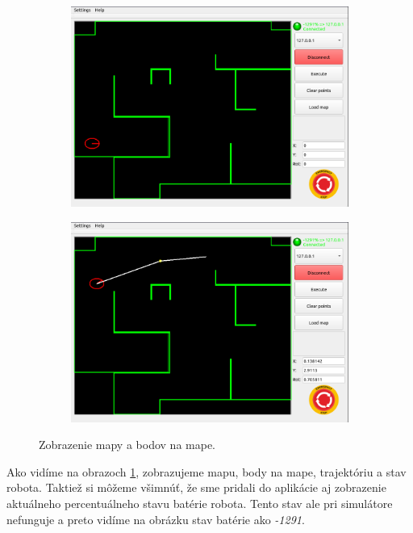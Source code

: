 \begin{figure}[!htbp]
	\vspace{1cm}
	\begin{subfigure}{0.49\textwidth}
		\includegraphics[width=\textwidth]{img/supervisor_loaded_map_start.png}
	\end{subfigure}
	\hfill
	\begin{subfigure}{0.49\textwidth}
		\includegraphics[width=\textwidth]{img/supervisor_motion.png}
	\end{subfigure}

	\caption{ Zobrazenie mapy a bodov na mape. }
	\label{fig:map}
\end{figure}

Ako vidíme na obrazoch \ref{fig:map}, zobrazujeme mapu, body na mape, trajektóriu a stav robota.
Taktiež si môžeme všimnúť, že sme pridali do aplikácie aj zobrazenie aktuálneho percentuálneho
stavu batérie robota. Tento stav ale pri simulátore nefunguje a preto vidíme na obrázku stav
batérie ako \textit{-1291}.

